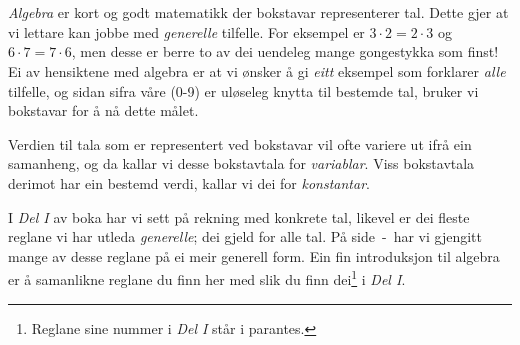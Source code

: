


\section{\algintro}
\textit{Algebra} er kort og godt matematikk der bokstavar representerer tal. Dette gjer at vi lettare kan jobbe med \textsl{generelle} tilfelle. For eksempel er $ {3\cdot 2=2\cdot3} $ og $ 6\cdot7=7\cdot6 $, men desse er berre to av dei uendeleg mange gongestykka som finst! Ei av hensiktene med algebra er at vi ønsker å gi \textsl{eitt} eksempel som forklarer \textsl{alle} tilfelle, og sidan sifra våre (0-9) er uløseleg knytta til bestemde tal, bruker vi bokstavar for å nå dette målet. \vsk

Verdien til tala som er representert ved bokstavar vil ofte variere ut ifrå ein samanheng, og da kallar vi desse bokstavtala for \textit{variablar}. Viss bokstavtala derimot har ein bestemd verdi, kallar vi dei for \textit{konstantar}.

\vsk

I \textsl{Del I} av boka har vi sett på rekning med konkrete tal, likevel er dei fleste reglane vi har utleda \textsl{generelle}; dei gjeld for alle tal. På side \pageref{regstart}\,-\,\pageref{regslutt} har vi gjengitt mange av desse reglane på ei meir generell form. Ein fin introduksjon til algebra er å samanlikne reglane du finn her med slik du finn dei\footnote{Reglane sine nummer i \textsl{Del I} står i parantes.} i \textsl{Del I}. \vsk

\regv
\label{regstart}
\reg[\adkom\;(\ref{adkom}) \label{adkomalg}]{\vs
\[ a+ b =b+a \]
}
\eks{ \vsb
\[ 7+ 5=5+7 \]
} \vsk \vsk

\reg[\gangkom\;(\ref{gangkom})]{\vs
	\[ a\cdot b =b\cdot a \]
}
\eks[1]{ \vsb
	\[ 9\cdot 8=8\cdot9 \]
}
\eks[2]{ \vsb
\[  8\cdot a= a\cdot 8  \]
}
\newpage
{}
\vsk 

\reg[\brdef\;(\ref{brdef})]{
\[ a:b=\frac{a}{b} \]
}
\eks[]{ \vs
\[a:2= \frac{a}{2} \]
}
 \vsk 

\reg[\brtbr\; (\ref{brtbr})]{
\[ \frac{a}{b}\cdot\frac{c}{d}=\frac{a c}{b d} \]
}
\eks[2]{ \vs
	\[ \frac{3}{b}\cdot \frac{a}{7}=\frac{3 a}{7b} \]
}
\newpage
\reg[\brdelmbr\;(\ref{delmbr})]{ 
\[ \frac{a}{b}:\frac{c}{d}=\frac{a}{b}\cdot \frac{d}{c} \]
}
\eks[1]{ \vs
\[ \frac{1}{2}:\frac{5}{7}=\frac{1}{2}\cdot \frac{7}{5} \]
}
 \vsk \vsk

